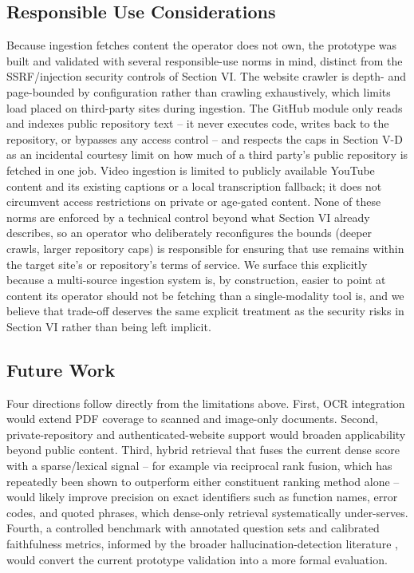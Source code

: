 \documentclass[conference]{IEEEtran}
\begin{document}
\subsection{Responsible Use Considerations}
Because ingestion fetches content the operator does not own, the
prototype was built and validated with several responsible-use norms in
mind, distinct from the SSRF/injection security controls of Section VI.
The website crawler is depth- and page-bounded by configuration rather
than crawling exhaustively, which limits load placed on third-party
sites during ingestion. The GitHub module only reads and indexes public
repository text -- it never executes code, writes back to the
repository, or bypasses any access control -- and respects the caps in
Section V-D as an incidental courtesy limit on how much of a third
party's public repository is fetched in one job. Video ingestion is
limited to publicly available YouTube content and its existing captions
or a local transcription fallback; it does not circumvent access
restrictions on private or age-gated content. None of these norms are
enforced by a technical control beyond what Section VI already
describes, so an operator who deliberately reconfigures the bounds
(deeper crawls, larger repository caps) is responsible for ensuring that
use remains within the target site's or repository's terms of service.
We surface this explicitly because a multi-source ingestion system is,
by construction, easier to point at content its operator should not be
fetching than a single-modality tool is, and we believe that trade-off
deserves the same explicit treatment as the security risks in Section
VI rather than being left implicit.

\subsection{Future Work}
Four directions follow directly from the limitations above. First, OCR
integration would extend PDF coverage to scanned and image-only
documents. Second, private-repository and authenticated-website support
would broaden applicability beyond public content. Third, hybrid
retrieval that fuses the current dense score with a sparse/lexical
signal -- for example via reciprocal rank fusion, which has repeatedly
been shown to outperform either constituent ranking method alone
\cite{cormack2009rrf} -- would likely improve precision on exact
identifiers such as function names, error codes, and quoted phrases,
which dense-only retrieval systematically under-serves. Fourth, a
controlled benchmark with annotated question sets and calibrated
faithfulness metrics, informed by the broader hallucination-detection
literature \cite{huang2024hallucination}, would convert the current
prototype validation into a more formal evaluation.
\end{document}
